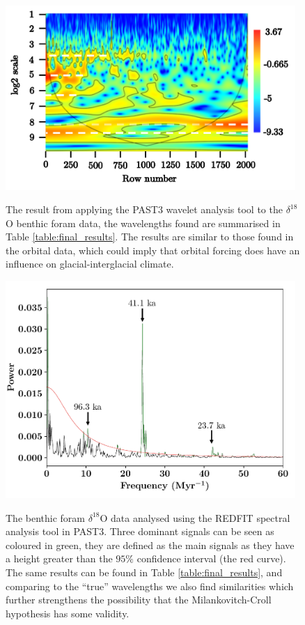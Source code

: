 \documentclass[12pt, onecolumn]{revtex4}    %
\begin{document}
\begin{figure}[!h]
\begin{center}
\includegraphics[width=11cm]{figures/wa_d18O.pdf}
\caption[]{The result from applying the PAST3 wavelet analysis tool to the $\delta^{18}$O benthic foram data, the wavelengths found are summarised in Table \ref{table:final_results}. The results are similar to those found in the orbital data, which could imply that orbital forcing does have an influence on glacial-interglacial climate.}
\vspace{-3ex}
\label{fig:wa_d18o}
\end{center}
\end{figure}

\begin{figure}[!h]
\begin{center}
\includegraphics[width=11cm]{figures/d18O_redfit}
\caption[]{The benthic foram $\delta^{18}$O data analysed using the REDFIT spectral analysis tool in PAST3. Three dominant signals can be seen as coloured in green, they are defined as the main signals as they have a height greater than the $95\%$ confidence interval (the red curve). The same results can be found in Table \ref{table:final_results}, and comparing to the ``true'' wavelengths we also find similarities which further strengthens the possibility that the Milankovitch-Croll hypothesis has some validity.}
\vspace{-3ex}
\label{fig:d18o_redfit}
\end{center}
\end{figure}
\end{document}
